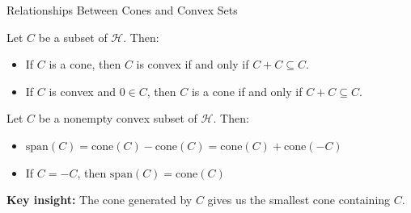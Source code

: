 \documentclass[aspectratio=169,10pt]{beamer}
\begin{document}
\begin{frame}{Relationships Between Cones and Convex Sets}
\begin{proposition}[6.3]
Let $C$ be a subset of $\mathcal{H}$. Then:
\begin{itemize}
    \item[(i)] If $C$ is a cone, then $C$ is convex if and only if $C + C \subseteq C$.
    \item[(ii)] If $C$ is convex and $0 \in C$, then $C$ is a cone if and only if $C + C \subseteq C$.
\end{itemize}
\end{proposition}

\vspace{0.3cm}

\begin{proposition}[6.4]
Let $C$ be a nonempty convex subset of $\mathcal{H}$. Then:
\begin{itemize}
    \item[(i)] $\text{span}(C) = \text{cone}(C) - \text{cone}(C) = \text{cone}(C) + \text{cone}(-C)$
    \item[(ii)] If $C = -C$, then $\text{span}(C) = \text{cone}(C)$
\end{itemize}
\end{proposition}

\vspace{0.3cm}

\textbf{Key insight:} The cone generated by $C$ gives us the smallest cone containing $C$.
\end{frame}
\end{document}
